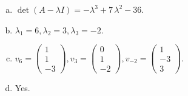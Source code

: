 \begin{questions}
\begin{solution}
\begin{enumerate}[(a)]
\item $\det(A-\lambda I)=-{\lambda}^{3} + 7 \, {\lambda}^{2} - 36$.
\item ${\lambda}_1=6, {\lambda}_2=3, {\lambda}_3=-2$.
\item $v_{6}=\left(\begin{array}{r}
1 \\
1 \\
-3
\end{array}\right), v_{3}=\left(\begin{array}{r}
0 \\
1 \\
-2
\end{array}\right), v_{-2}=\left(\begin{array}{r}
1 \\
-3 \\
3
\end{array}\right)$.
\item Yes.
\end{enumerate}
\end{solution}

\end{questions}

\newpage


\begin{center}
\end{center}

